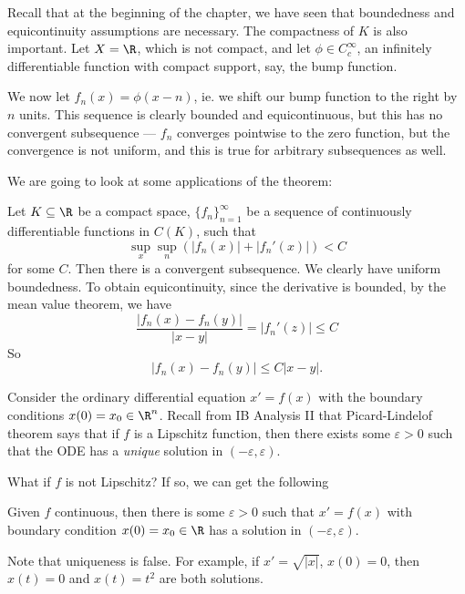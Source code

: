 \documentclass[a4paper]{article}
\begin{document}
Recall that at the beginning of the chapter, we have seen that boundedness and equicontinuity assumptions are necessary. The compactness of $K$ is also important. Let $X = \R$, which is not compact, and let $\phi \in C_c^{\infty}$, an infinitely differentiable function with compact support, say, the bump function.
\begin{center}
\end{center}
We now let $f_n(x) = \phi(x - n)$, ie. we shift our bump function to the right by $n$ units. This sequence is clearly bounded and equicontinuous, but this has no convergent subsequence --- $f_n$ converges pointwise to the zero function, but the convergence is not uniform, and this is true for arbitrary subsequences as well.

We are going to look at some applications of the theorem:

\begin{eg}
  Let $K\subseteq \R$ be a compact space, $\{f_n\}_{n = 1}^\infty$ be a sequence of continuously differentiable functions in $C(K)$, such that
  \[
    \sup_x \sup_n (|f_n(x)| + |f_n'(x)|) < C
  \]
  for some $C$. Then there is a convergent subsequence. We clearly have uniform boundedness. To obtain equicontinuity, since the derivative is bounded, by the mean value theorem, we have
  \[
    \frac{|f_n(x) - f_n(y)|}{|x - y|} = |f_n'(z)| \leq C
  \]
  So
  \[
    |f_n(x) - f_n(y)| \leq C |x - y|.
  \]
\end{eg}

Consider the ordinary differential equation $x' = f(x)$ with the boundary conditions $x(0) = x_0 \in \R^n$. Recall from IB Analysis II that Picard-Lindelof theorem says that if $f$ is a Lipschitz function, then there exists some $\varepsilon > 0$ such that the ODE has a \emph{unique} solution in $(-\varepsilon, \varepsilon)$.

What if $f$ is not Lipschitz? If so, we can get the following
\begin{thm}[Peano*]
  Given $f$ continuous, then there is some $\varepsilon > 0$ such that $x' = f(x)$ with boundary condition $x(0) = x_0 \in \R$ has a solution in $(-\varepsilon, \varepsilon)$.
\end{thm}
Note that uniqueness is false. For example, if $x' = \sqrt{|x|}$, $x(0) = 0$, then $x(t) = 0$ and $x(t) = t^2$ are both solutions.
\end{document}

